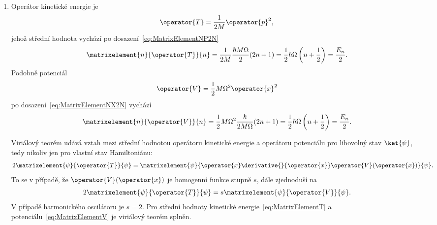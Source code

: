 \begin{solution}
\begin{enumerate}
	\item
		Operátor kinetické energie je
		\begin{equation}
            \operator{T}
                =\frac{1}{2M}\operator{p}^{2},
		\end{equation}
		jehož střední hodnota vychází po dosazení~\eqref{eq:MatrixElementNP2N}
		\begin{equation}\label{eq:MatrixElementT}
			\matrixelement{n}{\operator{T}}{n}
				=\frac{1}{2M}\frac{\hbar M\Omega}{2}(2n+1)
				=\frac{1}{2}\hbar\Omega\left(n+\frac{1}{2}\right)
				=\frac{E_{n}}{2}.
		\end{equation}
		Podobně potenciál
		\begin{equation}
            \operator{V}
                =\frac{1}{2}M\Omega^{2}\operator{x}^{2}
		\end{equation}
		po dosazení~\eqref{eq:MatrixElementNX2N} vychází
		\begin{equation}\label{eq:MatrixElementV}
			\matrixelement{n}{\operator{V}}{n}
				=\frac{1}{2}M\Omega^{2}\frac{\hbar}{2M\Omega}(2n+1)
				=\frac{1}{2}\hbar\Omega\left(n+\frac{1}{2}\right)
				=\frac{E_{n}}{2}.
		\end{equation}
	
		Viriálový teorém udává vztah mezi střední hodnotou operátoru kinetické energie 
		a operátoru potenciálu pro libovolný stav $\ket{\psi}$, tedy nikoliv jen pro vlastní stav Hamiltoniánu:
		\begin{equation}
			2\matrixelement{\psi}{\operator{T}}{\psi}
				=\matrixelement{\psi}{\operator{x}\derivative{}{\operator{x}}\operator{V}(\operator{x})}{\psi}.
		\end{equation}
		To se v případě, že $\operator{V}(\operator{x})$ je homogenní funkce stupně $s$, dále zjednoduší na
		\begin{equation}
			2\matrixelement{\psi}{\operator{T}}{\psi}=s\matrixelement{\psi}{\operator{V}}{\psi}.
		\end{equation}
        V případě harmonického oscilátoru je $s=2$. 
        Pro střední hodnoty kinetické energie~\eqref{eq:MatrixElementT} a potenciálu~\eqref{eq:MatrixElementV} je viriálový teorém splněn.
		

\end{enumerate}
\end{solution}
